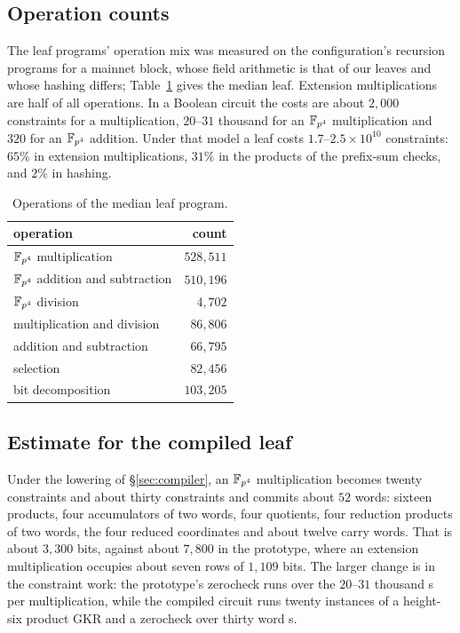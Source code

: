 \subsection{Operation counts}

The leaf programs' operation mix was measured on the \Poseidon{} configuration's recursion programs for a mainnet block, whose field arithmetic is that of our leaves and whose hashing differs; Table~\ref{tab:opmix} gives the median leaf. Extension multiplications are half of all operations. In a Boolean circuit the costs are about $2{,}000$ \AND{} constraints for a \KB{} multiplication, $20$--$31$ thousand for an $\mathbb{F}_{p^4}$ multiplication and $320$ for an $\mathbb{F}_{p^4}$ addition. Under that model a leaf costs $1.7$--$2.5\times 10^{10}$ \AND{} constraints: $65\%$ in extension multiplications, $31\%$ in the products of the prefix-sum checks, and $2\%$ in hashing.

\begin{table}[t]
\centering\small
\caption{Operations of the median leaf program.}
\label{tab:opmix}
\begin{tabular}{lr}
\toprule
operation & count \\
\midrule
$\mathbb{F}_{p^4}$ multiplication & $528{,}511$ \\
$\mathbb{F}_{p^4}$ addition and subtraction & $510{,}196$ \\
$\mathbb{F}_{p^4}$ division & $4{,}702$ \\
\KB{} multiplication and division & $86{,}806$ \\
\KB{} addition and subtraction & $66{,}795$ \\
selection & $82{,}456$ \\
bit decomposition & $103{,}205$ \\
\bottomrule
\end{tabular}
\end{table}

\subsection{Estimate for the compiled leaf}

Under the lowering of \S\ref{sec:compiler}, an $\mathbb{F}_{p^4}$ multiplication becomes twenty \MUL{} constraints and about thirty \AND{} constraints and commits about $52$ words: sixteen products, four accumulators of two words, four quotients, four reduction products of two words, the four reduced coordinates and about twelve carry words. That is about $3{,}300$ bits, against about $7{,}800$ in the prototype, where an extension multiplication occupies about seven rows of $1{,}109$ bits. The larger change is in the constraint work: the prototype's zerocheck runs over the $20$--$31$ thousand \AND{}s per multiplication, while the compiled circuit runs twenty instances of a height-six product GKR and a zerocheck over thirty word \AND{}s.

